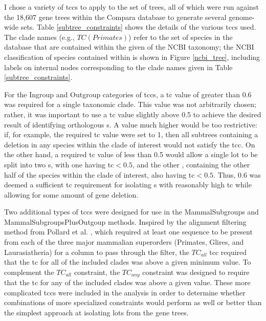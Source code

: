I chose a variety of \acp{tcc} to apply to the set of \cmp trees, all
of which were run against the 18,607 gene trees within the Compara
database to generate several genome-wide \subtr sets. Table
\ref{subtree_constraints} shows the details of the various \acp{tcc}
used. The clade names (e.g., $TC(Primates)$) refer to the set of
species in the \ens database that are contained within the given
\subtr of the NCBI taxonomy; the NCBI classification of species
contained within \ens is shown in Figure \ref{ncbi_tree}, including
labels on internal nodes corresponding to the clade names given in
Table \ref{subtree_constraints}.

For the Ingroup and Outgroup categories of \acp{tcc}, a \ac{tc} value
of greater than 0.6 was required for a single taxonomic clade. This
value was not arbitrarily chosen; rather, it was important to use a
\ac{tc} value slightly above 0.5 to achieve the desired result of
identifying orthologous \subtr{}s. A value much higher would be too
restrictive: if, for example, the required \ac{tc} value were set to
1, then all subtrees containing a deletion in any species within the
clade of interest would not satisfy the \ac{tcc}. On the other hand, a
required \ac{tc} value of less than 0.5 would allow a single \ac{lot}
to be split into two \subtr{}s, with one \subtr having \ac{tc}$<0.5$,
and the other \subtr, containing the other half of the species within
the clade of interest, also having \ac{tc}$<0.5$. Thus, 0.6 was deemed
a sufficient \ac{tc} requirement for isolating \subtr{}s with
reasonably high \ac{tc} while allowing for some amount of gene
deletion.

Two additional types of \acp{tcc} were designed for use in the
MammalSubgroups and MammalSubgroupsPlusOutgoup methods. Inspired by
the alignment filtering method from Pollard et
al. \citeyearpar{Pollard2010}, which required at least one sequence to
be present from each of the three major mammalian superorders
(Primates, Glires, and Laurasiatheria) for a column to pass through
the filter, the $TC_{all}$ \ac{tcc} required that the \ac{tc} for all
of the included clades was above a given minimum value. To complement
the $TC_{all}$ constraint, the $TC_{any}$ constraint was designed to
require that the \ac{tc} for any of the included clades was above a
given value. These more complicated \acp{tcc} were included in the
analysis in order to determine whether combinations of more
specialized constraints would perform as well or better than the
simplest approach at isolating \acp{lot} from the \cmp gene trees.

